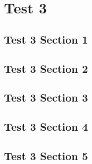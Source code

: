 \chapter{Test 3}
\localtableofcontents
\clearpage

\section{Test 3 Section 1}

\linebreak

\section{Test 3 Section 2}

\linebreak

\section{Test 3 Section 3}

\linebreak

\section{Test 3 Section 4}

\linebreak

\section{Test 3 Section 5}

\linebreak